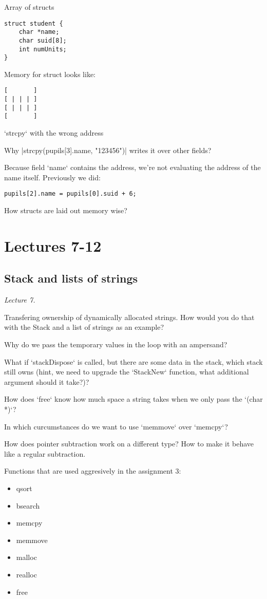 Array of structs

\begin{lstlisting}
struct student {
    char *name;
    char suid[8];
    int numUnits;
}
\end{lstlisting}

Memory for struct looks like:
\begin{verbatim}
[       ]
[ | | | ]
[ | | | ]
[       ]
\end{verbatim}

`strcpy` with the wrong address

Why |strcpy(pupils[3].name, "123456")| writes it over other fields?

Because field `name` contains the address, we're not evaluating the address of
the name itself. Previously we did:

\begin{lstlisting}
pupils[2].name = pupils[0].suid + 6;
\end{lstlisting}

How structs are laid out memory wise?

\section{Lectures 7-12}

\subsection{Stack and lists of strings}%
\label{sub:stack_and_lists_of_strings}
\textit{Lecture 7.}

Transfering ownership of dynamically allocated strings. How would you do that
with the Stack and a list of strings as an example?

Why do we pass the temporary values in the loop with an ampersand?

What if `stackDispose` is called, but there are some data in the stack, which
stack still owns (hint, we need to upgrade the `StackNew` function, what
additional argument should it take?)?

How does `free` know how much space a string takes when we only pass the `(char
*)`?

In which curcumstances do we want to use `memmove` over `memcpy`?

How does pointer subtraction work on a different type? How to make it behave
like a regular subtraction.

Functions that are used aggresively in the assignment 3:
\begin{itemize}
    \item qsort
    \item bsearch
    \item memcpy
    \item memmove
    \item malloc
    \item realloc
    \item free
\end{itemize}

